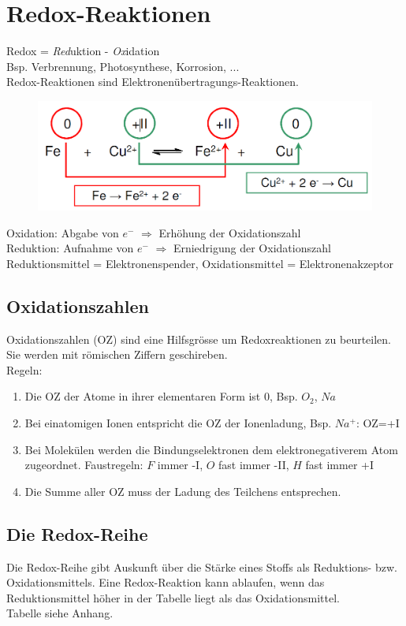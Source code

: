 \section{Redox-Reaktionen}
Redox = \emph{Red}uktion - \emph{Ox}idation \\
Bsp. Verbrennung, Photosynthese, Korrosion, ... \\

Redox-Reaktionen sind Elektronenübertragungs-Reaktionen.
\begin{figure}[htbp]
	\centering
	\includegraphics[width=0.6\linewidth]{images/9_Redox_Reaktion.png}
\end{figure}

Oxidation: Abgabe von $e^-$ $\Rightarrow$ Erhöhung der Oxidationszahl \\
Reduktion: Aufnahme von $e^-$ $\Rightarrow$ Erniedrigung der Oxidationszahl \\

Reduktionsmittel = Elektronenspender, Oxidationsmittel = Elektronenakzeptor


\subsection{Oxidationszahlen}
Oxidationszahlen (OZ) sind eine Hilfsgrösse um Redoxreaktionen zu beurteilen. Sie werden mit römischen Ziffern geschireben. \\
Regeln:
\begin{enumerate}
	\item Die OZ der Atome in ihrer elementaren Form ist 0, Bsp. $O_2$, $Na$
	\item Bei einatomigen Ionen entspricht die OZ der Ionenladung, Bsp. $Na^+$: OZ=+I
	\item Bei Molekülen werden die Bindungselektronen dem elektronegativerem Atom zugeordnet. Faustregeln: $F$ immer -I, $O$ fast immer -II, $H$ fast immer +I
	\item Die Summe aller OZ muss der Ladung des Teilchens entsprechen.
\end{enumerate}

\subsection{Die Redox-Reihe}
Die Redox-Reihe gibt Auskunft über die Stärke eines Stoffs als Reduktions- bzw. Oxidationsmittels. Eine Redox-Reaktion kann ablaufen, wenn das Reduktionsmittel höher in der Tabelle liegt als das Oxidationsmittel.\\

Tabelle siehe Anhang. \\